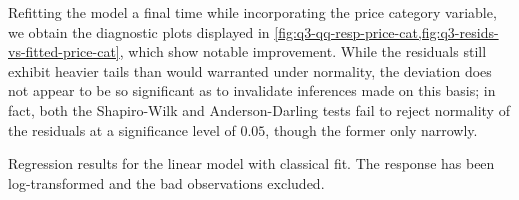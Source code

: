 \documentclass[titlepage]{article}
\begin{document}
Refitting the model a final time while incorporating the price category variable, we obtain the diagnostic plots displayed in \cref{fig:q3-qq-resp-price-cat,fig:q3-resids-vs-fitted-price-cat}, which show notable improvement. While the residuals still exhibit heavier tails than would warranted under normality, the deviation does not appear to be so significant as to invalidate inferences made on this basis; in fact, both the Shapiro-Wilk and Anderson-Darling tests fail to reject normality of the residuals at a significance level of $0.05$, though the former only narrowly.

\begin{table}[!htb]
  \centering
  \makebox[\textwidth][c]{}
  \caption{Regression results for the linear model with classical fit. The response has been log-transformed and the bad observations excluded.}
  \label{tab:q3-reg-res-price-cat}
\end{table}
\end{document}
